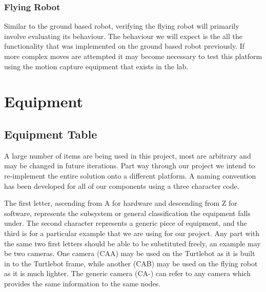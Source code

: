 \documentclass{article}
\begin{document}
	\subsubsection{Flying Robot}
	
	Similar to the ground based robot, verifying the flying robot will primarily involve evaluating its behaviour. The behaviour we will expect is the all the functionality that was implemented on the ground based robot previously. If more complex moves are attempted it may become necessary to test this platform using the motion capture equipment that exists in the lab.


\section{Equipment}

	\subsection{Equipment Table}
	
	A large number of items are being used in this project, most are arbitrary and may be changed in future iterations. Part way through our project we intend to re-implement the entire solution onto a different platform. A naming convention has been developed for all of our components using a three character code.
	
	The first letter, ascending from A for hardware and descending from Z for software, represents the subsystem or general classification the equipment falls under. The second character represents a generic piece of equipment, and the third is for a particular example that we are using for our project. Any part with the same two first letters should be able to be substituted freely, an example may be two cameras. One camera (CAA) may be used on the Turtlebot as it is built in to the Turtlebot frame, while another (CAB) may be used on the flying robot as it is much lighter. The generic camera (CA-) can refer to any camera which provides the same information to the same nodes.
	
\end{document}
